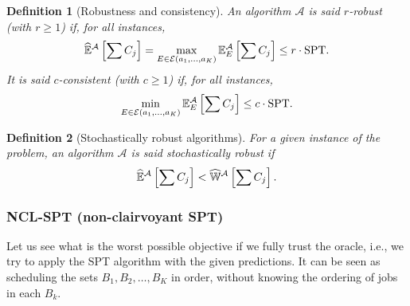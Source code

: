 \documentclass{article}
\newtheorem{definition}{Definition}
\begin{document}
\begin{definition}[Robustness and consistency]
    An algorithm \(\mathcal{A}\) is said \(r\)-robust (with \(r\ge 1\)) if, for all instances,
    \[
        \widehat{\mathbb{E}}^{\mathcal{A}}\left[\sum C_j\right]=\max_{E\in\mathcal{E}(a_1,\ldots,a_K)} \mathbb{E}^{\mathcal{A}}_E\left[\sum C_j\right] \le r\cdot \text{SPT}.
    \]
    It is said \(c\)-consistent (with \(c\ge 1\)) if, for all instances,
    \[
        \min_{E\in\mathcal{E}(a_1,\ldots,a_K)} \mathbb{E}^{\mathcal{A}}_E\left[\sum C_j\right] \le c\cdot \text{SPT}.
    \]
\end{definition}

\begin{definition}[Stochastically robust algorithms]
    For a given instance of the problem, an algorithm \(\mathcal{A}\) is said \emph{stochastically robust} if
    \[
        \widehat{\mathbb{E}}^{\mathcal{A}}\left[\sum C_j\right] < \widehat{\mathbb{W}}^{\mathcal{A}}\left[\sum C_j\right].
    \]
\end{definition}




\subsubsection{NCL-SPT (non-clairvoyant SPT)}

Let us see what is the worst possible objective if we fully trust the oracle, i.e., we try to apply the SPT algorithm with the given predictions.
It can be seen as scheduling the sets \(B_1,B_2,\dots,B_K\) in order, without knowing the ordering of jobs in each \(B_k\).
\end{document}
